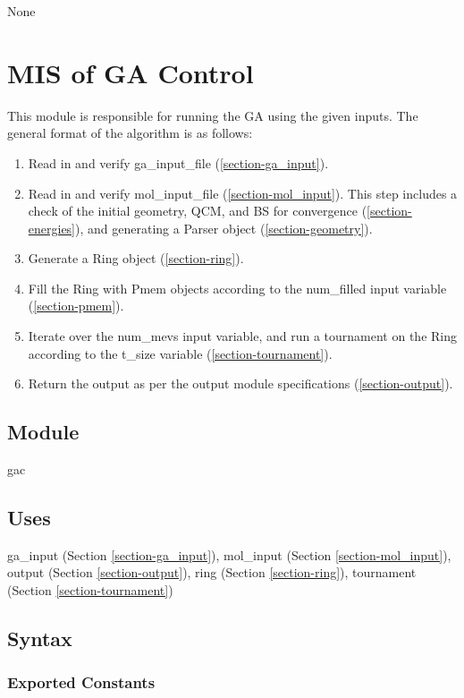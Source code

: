 \documentclass[12pt, titlepage]{article}
\begin{document}
None

\section{MIS of GA Control} \label{section-gac} 

This module is responsible for running the GA using the given inputs. The 
general format of the algorithm is as follows:
\begin{enumerate}
	\item Read in and verify ga\_input\_file (\ref{section-ga_input}).
	\item Read in and verify mol\_input\_file (\ref{section-mol_input}). This 
	step includes a check of the initial geometry, QCM, and BS for convergence 
	(\ref{section-energies}), and generating a Parser object 
	(\ref{section-geometry}).
	\item Generate a Ring object (\ref{section-ring}).
	\item Fill the Ring with Pmem objects according to the num\_filled input 
	variable (\ref{section-pmem}).
	\item Iterate over the num\_mevs input variable, and run a tournament on 
	the Ring according to the t\_size variable (\ref{section-tournament}).
	\item Return the output as per the output module specifications 
	(\ref{section-output}).
\end{enumerate}

\subsection{Module}

gac

\subsection{Uses}

ga\_input (Section \ref{section-ga_input}), 
mol\_input (Section \ref{section-mol_input}),
output (Section \ref{section-output}),
ring (Section \ref{section-ring}),
tournament (Section \ref{section-tournament})

\subsection{Syntax}

\subsubsection{Exported Constants}
\end{document}
